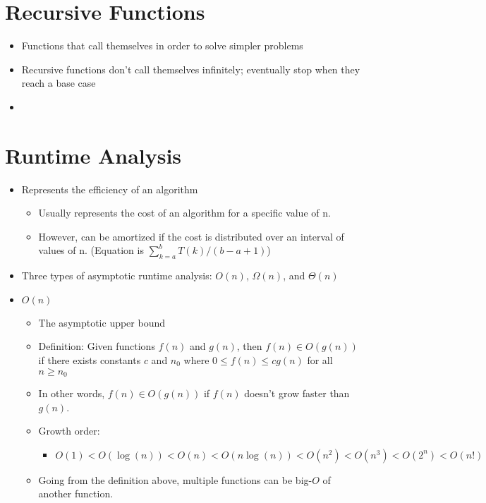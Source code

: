 \documentclass{article}
\begin{document}
\section{Recursive Functions}
\begin{itemize}
    \item Functions that call themselves in order to solve simpler problems
    \item Recursive functions don't call themselves infinitely; eventually stop when they reach a base case
    \item 
\end{itemize}

\section{Runtime Analysis}
\begin{itemize}
    \item Represents the efficiency of an algorithm
    	\begin{itemize}
    		\item Usually represents the cost of an algorithm for a specific value of n. 
    		\item However, can be amortized if the cost is distributed over an interval of values of n. (Equation is $\sum_{k=a}^{b} T(k) / (b-a+1)$)
    	\end{itemize}
    \item Three types of asymptotic runtime analysis: $O(n)$, $\Omega(n)$, and $\Theta(n)$
    \item $O(n)$
        \begin{itemize}
            \item The asymptotic upper bound
            \item Definition: Given functions $f(n)$ and $g(n)$, then $f(n) \in O(g(n))$ if there exists constants $c$ and $n_0$ where $0 \leq f(n) \leq cg(n)$ for all $n \geq n_0$
            \item In other words, $f(n) \in O(g(n))$ if $f(n)$ doesn't grow faster than $g(n)$.
            \item Growth order:
                \begin{itemize}
                    \item $O(1) < O(\log(n)) < O(n) < O(n \log(n)) < O(n^2) < O(n^3) < O(2^n) < O(n!)$
                \end{itemize}
            \item Going from the definition above, multiple functions can be big-$O$ of another function.

\end{itemize}
\end{itemize}
\end{document}
